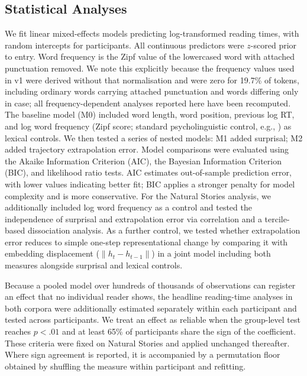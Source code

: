 \documentclass[12pt]{article}
\newcommand{\new}[1]{#1}   %
\begin{document}
\subsection{Statistical Analyses}

We fit linear mixed-effects models predicting log-transformed reading times, with random intercepts for participants. All continuous predictors were $z$-scored prior to entry. \new{Word frequency is the Zipf value of the lowercased word with attached punctuation removed. We note this explicitly because the frequency values used in v1 were derived without that normalisation and were zero for 19.7\% of tokens, including ordinary words carrying attached punctuation and words differing only in case; all frequency-dependent analyses reported here have been recomputed.} The baseline model (M0) included word length, word position, previous log RT, and log word frequency (Zipf score; standard psycholinguistic control, e.g., \citealp{smith2013}) as lexical controls. We then tested a series of nested models: M1 added surprisal; M2 added trajectory extrapolation error. Model comparisons were evaluated using the Akaike Information Criterion (AIC), the Bayesian Information Criterion (BIC), and likelihood ratio tests. AIC estimates out-of-sample prediction error, with lower values indicating better fit; BIC applies a stronger penalty for model complexity and is more conservative. For the Natural Stories analysis, we additionally included log word frequency as a control and tested the independence of surprisal and extrapolation error via correlation and a tercile-based dissociation analysis. As a further control, we tested whether extrapolation error reduces to simple one-step representational change by comparing it with embedding displacement ($\|h_t - h_{t-1}\|$) in a joint model including both measures alongside surprisal and lexical controls.

\new{Because a pooled model over hundreds of thousands of observations can register an effect that no individual reader shows, the headline reading-time analyses in both corpora were additionally estimated separately within each participant and tested across participants. We treat an effect as reliable when the group-level test reaches $p < .01$ and at least 65\% of participants share the sign of the coefficient. These criteria were fixed on Natural Stories and applied unchanged thereafter. Where sign agreement is reported, it is accompanied by a permutation floor obtained by shuffling the measure within participant and refitting.}
\end{document}
